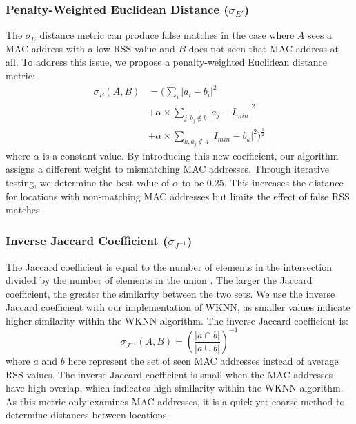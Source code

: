 \documentclass[conference]{IEEEtran}
\begin{document}
\subsubsection{Penalty-Weighted Euclidean Distance ($\sigma_{E'}$)}
\indent The $\sigma_E$ distance metric can produce false matches in the case where $A$ sees a MAC address with a low RSS value and $B$ does not seen that MAC address at all. To address this issue, we propose a penalty-weighted Euclidean distance metric:
\begin{equation} \label{eq:penalty_weighted_euclidean}
\begin{split}
\sigma_{E}(A, B) & = (\sum\limits_{i}|a_i-b_i|^2 \\
			& +  \alpha\times\sum\limits_{j, b_j\notin b}|a_j-I_{min}|^2 \\
			& + \alpha\times\sum\limits_{k, a_j\notin a}|I_{min}-b_k|^2)^\frac{1}{2}
\end{split}
\end{equation}
where $\alpha$ is a constant value. By introducing this new coefficient, our algorithm assigns a different weight to mismatching MAC addresses.  Through iterative testing, we determine the best value of $\alpha$ to be 0.25. This increases the distance for locations with non-matching MAC addresses but limits the effect of false RSS matches.
	
\subsubsection{Inverse Jaccard Coefficient ($\sigma_{J^{-1}}$)}
\indent The Jaccard coefficient is equal to the number of elements in the intersection divided by the number of elements in the union \cite{Dunbar}. The larger the Jaccard coefficient, the greater the similarity between the two sets. We use the inverse Jaccard coefficient with our implementation of WKNN, as smaller values indicate higher similarity within the WKNN algorithm. The inverse Jaccard coefficient is: 
\begin{equation}
\label{eq:jaccard}
\sigma_{J^{-1}}(A, B) = \left(\frac{|a\cap b|}{|a\cup b|}\right)^{-1}
\end{equation}
where $a$ and $b$ here represent the set of seen MAC addresses instead of average RSS values. The inverse Jaccard coefficient is small when the MAC addresses have high overlap, which indicates high similarity within the WKNN algorithm. As this metric only examines MAC addresses, it is a quick yet coarse method to determine distances between locations.
\end{document}
